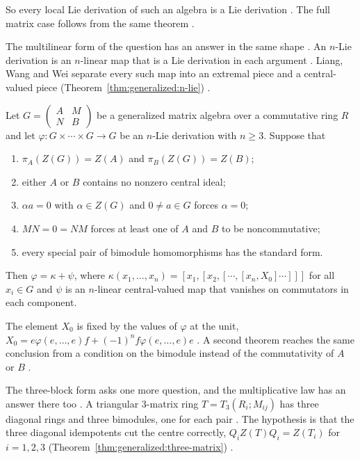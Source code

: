 So every local Lie derivation of such an algebra is a Lie derivation
\cite[p.~3]{Liu2021LocalLie}. The full matrix case follows from the same
theorem \cite[Theorem~3.1, p.~18]{Liu2021LocalLie}.

The multilinear form of the question has an answer in the same shape
\cite[p.~1]{LiangWangWei2026}. An $n$-Lie derivation is an $n$-linear map that
is a Lie derivation in each argument \cite[p.~1]{LiangWangWei2026}. Liang,
Wang and Wei separate every such map into an extremal piece and a
central-valued piece (Theorem~\ref{thm:generalized:n-lie}) \cite[Theorem~4.1,
p.~25]{LiangWangWei2026}.\begin{theorem}\label{thm:generalized:n-lie} Let
$G=\begin{pmatrix}A&M\\N&B\end{pmatrix}$ be a generalized matrix algebra over
a commutative ring $R$ and let $\varphi\colon G\times\cdots\times G\to G$ be
an $n$-Lie derivation with $n\geq3$. Suppose that \begin{enumerate} \item
$\pi_A(Z(G))=Z(A)$ and $\pi_B(Z(G))=Z(B)$; \item either $A$ or $B$ contains no
nonzero central ideal; \item $\alpha a=0$ with $\alpha\in Z(G)$ and $0\neq
a\in G$ forces $\alpha=0$; \item $MN=0=NM$ forces at least one of $A$ and $B$
to be noncommutative; \item every special pair of bimodule homomorphisms has
the standard form. \end{enumerate} Then $\varphi=\kappa+\psi$, where
$\kappa(x_1,\dots,x_n)=[x_1,[x_2,[\cdots,[x_n,X_0]\cdots]]]$ for all $x_i\in
G$ and $\psi$ is an $n$-linear central-valued map that vanishes on commutators
in each component. \end{theorem}

The element $X_0$ is fixed by the values of $\varphi$ at the unit,
$X_0=e\varphi(e,\dots,e)f+(-1)^{n}f\varphi(e,\dots,e)e$
\cite[p.~2]{LiangWangWei2026}. A second theorem reaches the same conclusion
from a condition on the bimodule instead of the commutativity of $A$ or $B$
\cite[Theorem~4.3, p.~28]{LiangWangWei2026}.

The three-block form asks one more question, and the multiplicative law has an
answer there too \cite[Theorem~2.2, p.~5]{ChenHou2020}. A triangular
$3$-matrix ring $T=T_3(R_i;M_{ij})$ has three diagonal rings and three
bimodules, one for each pair \cite[p.~2]{ChenHou2020}. The hypothesis is that
the three diagonal idempotents cut the centre correctly, $Q_iZ(T)Q_i=Z(T_i)$
for $i=1,2,3$ (Theorem~\ref{thm:generalized:three-matrix}) \cite[Theorem~2.2,
p.~5]{ChenHou2020}.

